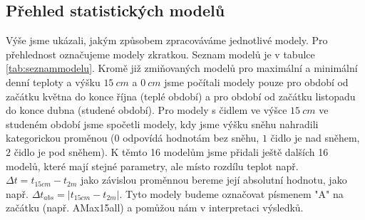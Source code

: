 \subsection{Přehled statistických modelů}
Výše jsme ukázali, jakým způsobem zpracováváme jednotlivé modely. Pro přehlednost označujeme modely zkratkou. Seznam modelů je v tabulce \ref{tab:seznammodelu}. Kromě již zmiňovaných modelů pro maximální a minimální denní teploty a výšku $\SI{15}{cm}$ a $\SI{0}{cm}$ jsme počítali modely pouze pro období od začátku května do konce října (teplé období) a pro období od začátku listopadu do konce dubna (studené období). Pro modely s čidlem ve výšce $\SI{15}{cm}$ ve studeném období jsme spočetli modely, kdy jsme výšku sněhu nahradili kategorickou proměnou ($0$ odpovídá hodnotám bez sněhu, $1$ čidlo je nad sněhem, $2$ čidlo je pod sněhem). K těmto 16 modelům jsme přidali ještě dalších 16 modelů, které mají stejné parametry, ale místo rozdílu teplot např. $\Delta t = t_{15cm} - t_{2m}$ jako závislou proměnnou bereme její absolutní hodnotu, jako např. $\Delta t_{abs} = \left|t_{15cm} - t_{2m}\right|$. Tyto modely budeme označovat písmenem "A" na začátku (např. AMax15all) a pomůžou nám v interpretaci výsledků.

